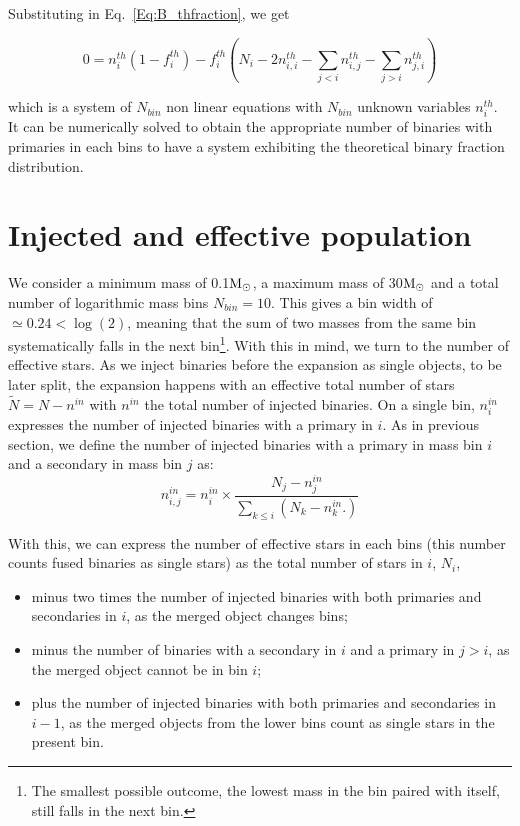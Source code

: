 Substituting in Eq.~\ref{Eq:B_thfraction}, we get

\begin{equation}
0 =  n_i^{th} \left( 1 - f_i^{th}\right) - f_i^{th}\left( N_i - 2  n_{i,i}^{th} - \sum\limits_{j<i} n_{i,j}^{th} - \sum\limits_{j>i} n_{j,i}^{th} \right)
\end{equation}

which is a system of $N_{bin}$ non linear equations with $N_{bin}$ unknown variables $n_i^{th}$. It can be numerically solved to obtain the appropriate number of binaries with primaries in each bins to have a system exhibiting the theoretical binary fraction distribution.

\section{Injected and effective population}

We consider a minimum mass of 0.1${\textrm{M}_\odot}$, a maximum mass of 30${\textrm{M}_\odot}$ and a total number of logarithmic mass bins $N_{bin} = 10$. This gives a bin width of $\simeq 0.24 < \log(2)$, meaning that the sum of two masses from the same bin systematically falls in the next bin\footnote{The smallest possible outcome, the lowest mass in the bin paired with itself, still falls in the next bin.}. With this in mind, we turn to the number of effective stars. As we inject binaries before the expansion as single objects, to be later split, the expansion happens with an effective total number of stars $\tilde{N} = N - n^{in}$ with $n^{in}$ the total number of injected binaries. On a single bin,  $n^{in}_i$ expresses the number of injected binaries with a primary in $i$. As in previous section, we define the number of injected binaries with a primary in mass bin $i$ and a secondary in mass bin $j$ as:
\begin{equation}
n_{i,j}^{in} = n_i^{in} \times \frac{N_j - n_j^{in} }{\sum\limits_{k\le i} \left( N_k - n_k^{in}. \right) }
\end{equation}

With this, we can express the number of effective stars in each bins (this number counts fused binaries as single stars) as the total number of stars in $i$, $N_i$,

\begin{itemize}
\item minus two times the number of injected binaries with both primaries and secondaries in $i$, as the merged object changes bins;
\item minus the number of binaries with a secondary in $i$ and a primary in $j>i$, as the merged object cannot be in bin $i$;
\item plus the number of injected binaries with both primaries and secondaries in $i-1$, as the merged objects from the lower bins count as single stars in the present bin.
\end{itemize}

